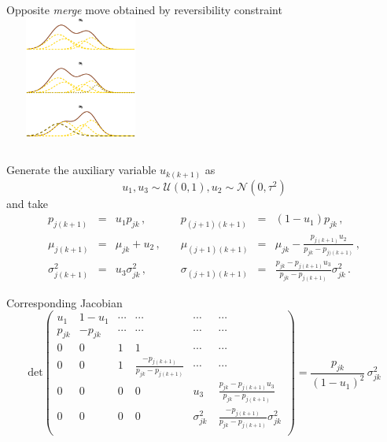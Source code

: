 \begin{slide}
\pause
\begin{columns}
Opposite {\em merge} move obtained by reversibility constraint
\includegraphics[width=5cm,height=4cm]{figures/birthandeath.eps}
\end{columns}

\end{slide}\begin{slide}

Generate the auxiliary variable $u_{k(k+1)}$ as 
$$
u_1,u_3\sim{\mathcal U}(0,1), u_2\sim\mathscr{N}(0,\tau^2)
$$
and take
$$
\begin{array}{rclrcl}
p_{j(k+1)}        &=&  u_1 p_{jk}\,,  &\quad
p_{(j+1)(k+1)} &=&  (1-u_1)p_{jk}\,,  \\
\mu_{j(k+1)}      &=&  \mu_{jk}+u_2 \,,&\quad
\mu_{(j+1)(k+1)}  &=&  \mu_{jk}-\frac{p_{j(k+1)}u_2}{p_{jk}-p_{j)(k+1)}}\,,\\
\sigma_{j(k+1)}^2 &=&  u_3 \sigma_{jk}^2\,, &\quad
\sigma_{(j+1)(k+1)} &=& \frac{p_{jk}-p_{j(k+1)}u_3}{p_{jk}-p_{j(k+1)}}\sigma_{jk}^2
\,.
\end{array}
$$

\end{slide}\begin{slide}

Corresponding Jacobian
\footnotesize
$$
\text{det}\left(\begin{matrix}
u_1 &1-u_1 &\cdots &\cdots &\cdots &\cdots \\
p_{jk} &-p_{jk} &\cdots &\cdots &\cdots &\cdots \\
0 &0 &1 &1 &\cdots &\cdots \\
0 &0 &1 &\frac{-p_{j(k+1)}}{p_{jk}-p_{j(k+1)}} &\cdots &\cdots \\
0 &0 &0 &0 &u_3 &\frac{p_{jk}-p_{j(k+1)}u_3}{p_{jk}-p_{j(k+1)}}\\
0 &0 &0 &0 &\sigma_{jk}^2\ &\frac{-p_{j(k+1)}}{p_{jk}-p_{j(k+1)}}\sigma_{jk}^2\\
\end{matrix}\right)
= \frac{p_{jk}}{(1-u_1)^2}\,\sigma_{jk}^2
$$\normalsize


\end{slide}
